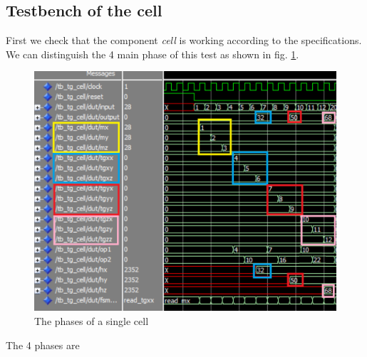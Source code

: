 \subsection{Testbench of the cell}
First we check that the component \textit{cell} is working according to the specifications.
We can distinguish the 4 main phase of this test as shown in fig. \ref{fig:tb_cell_phases}.
  \begin{figure}[h]
  	\centering
  	\includegraphics[width=\textwidth]{imm/3d/tb_cell_phases.png}  
  	\caption{The phases of a single cell}
  	\label{fig:tb_cell_phases}
  \end{figure}
The 4 phases are
